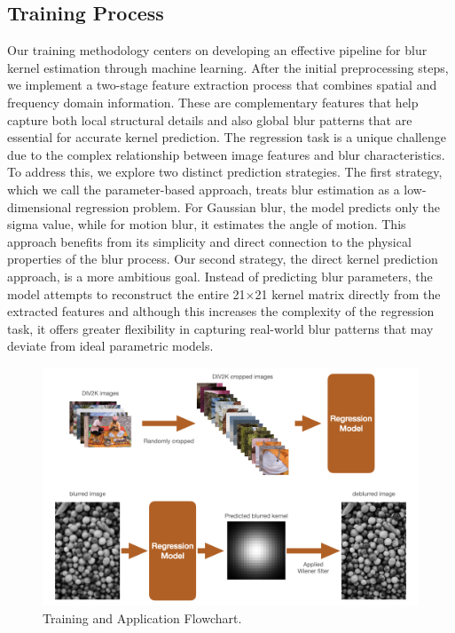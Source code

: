 \documentclass[twoside,11pt]{article}
\begin{document}
\subsection{Training Process}
Our training methodology centers on developing an effective pipeline for blur kernel estimation through machine learning. After the initial preprocessing steps, we implement a two-stage feature extraction process that combines spatial and frequency domain information. These are complementary features that help capture both local structural details and also global blur patterns that are essential for accurate kernel prediction.
The regression task is a unique challenge due to the complex relationship between image features and blur characteristics. To address this, we explore two distinct prediction strategies. The first strategy, which we call the parameter-based approach, treats blur estimation as a low-dimensional regression problem. For Gaussian blur, the model predicts only the sigma value, while for motion blur, it estimates the angle of motion. This approach benefits from its simplicity and direct connection to the physical properties of the blur process.
Our second strategy, the direct kernel prediction approach, is a more ambitious goal. Instead of predicting blur parameters, the model attempts to reconstruct the entire 21×21 kernel matrix directly from the extracted features and although this increases the complexity of the regression task, it offers greater flexibility in capturing real-world blur patterns that may deviate from ideal parametric models.

\begin{figure}[H]
\centering
\includegraphics[width=1\textwidth]{figure6.png}
\caption{Training and Application Flowchart.}
\end{figure}
\end{document}

